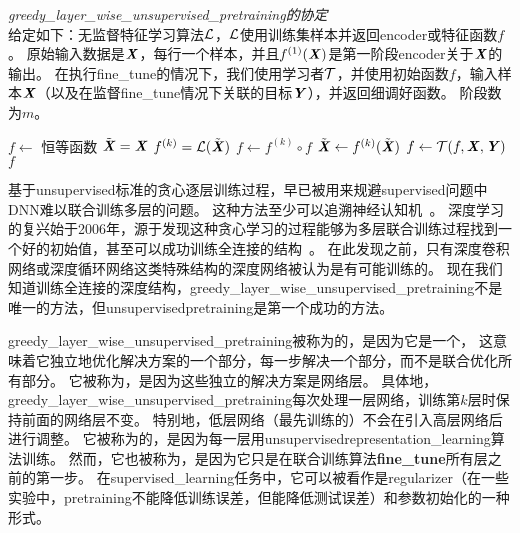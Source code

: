 \begin{algorithm}
\caption{ {\em \gls{greedy_layer_wise_unsupervised_pretraining}的协定}\\
给定如下：无监督特征学习算法$\mathcal{L}$，$\mathcal{L}$使用训练集样本并返回\gls{encoder}或特征函数$f$。
原始输入数据是$\boldsymbol{\mathit{X}}$，每行一个样本，并且$f^{(1)}(\boldsymbol{\mathit{X}})$是第一阶段\gls{encoder}关于$\boldsymbol{\mathit{X}}$的输出。
在执行\gls{fine_tune}的情况下，我们使用学习者$\mathcal{T}$，并使用初始函数$f$，输入样本$\boldsymbol{\mathit{X}}$（以及在监督\gls{fine_tune}情况下关联的目标$\boldsymbol{\mathit{Y}}$），并返回细调好函数。 阶段数为$m$。
}
\label{alg:pretraining}
\begin{algorithmic}
\STATE $f \leftarrow$ 恒等函数
\STATE $\tilde{\boldsymbol{\mathit{X}}} = \boldsymbol{\mathit{X}}$
  \STATE $f^{(k)} = {\mathcal{L}}(\tilde{\boldsymbol{\mathit{X}}})$
  \STATE $f \leftarrow f^{(k)} \circ f$
  \STATE $\tilde{\boldsymbol{\mathit{X}}} \leftarrow f^{(k)}(\tilde{\boldsymbol{\mathit{X}}})$
\ENDFOR
{}
  \STATE $f \leftarrow {\mathcal{T}}(f,\boldsymbol{\mathit{X}},\boldsymbol{\mathit{Y}})$
\ENDIF
{} $f$
\end{algorithmic}
\end{algorithm}


基于\gls{unsupervised}标准的贪心逐层训练过程，早已被用来规避\gls{supervised}问题中\gls{DNN}难以联合训练多层的问题。
这种方法至少可以追溯神经认知机~\citep{Fukushima75}。
深度学习的复兴始于2006年，源于发现这种贪心学习的过程能够为多层联合训练过程找到一个好的初始值，甚至可以成功训练全连接的结构~\citep{Hinton06-small,Hinton-Science2006,HintonG2006,Bengio-nips-2006,ranzato-07-small}。
在此发现之前，只有深度卷积网络或深度循环网络这类特殊结构的深度网络被认为是有可能训练的。
现在我们知道训练全连接的深度结构，\gls{greedy_layer_wise_unsupervised_pretraining}不是唯一的方法，但\gls{unsupervised}\gls{pretraining}是第一个成功的方法。


\gls{greedy_layer_wise_unsupervised_pretraining}被称为的，是因为它是一个，
这意味着它独立地优化解决方案的一个部分，每一步解决一个部分，而不是联合优化所有部分。
它被称为，是因为这些独立的解决方案是网络层。
具体地，\gls{greedy_layer_wise_unsupervised_pretraining}每次处理一层网络，训练第$k$层时保持前面的网络层不变。
特别地，低层网络（最先训练的）不会在引入高层网络后进行调整。
它被称为的，是因为每一层用\gls{unsupervised}\gls{representation_learning}算法训练。
然而，它也被称为，是因为它只是在联合训练算法\textbf{\gls{fine_tune}}所有层之前的第一步。
在\gls{supervised_learning}任务中，它可以被看作是\gls{regularizer}（在一些实验中，\gls{pretraining}不能降低训练误差，但能降低测试误差）和参数初始化的一种形式。


